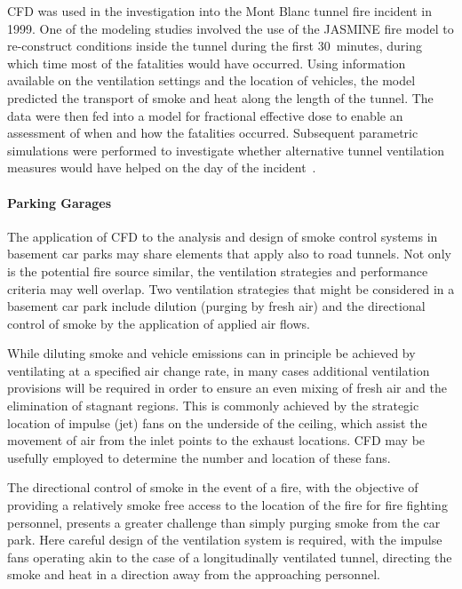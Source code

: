 \documentclass[graybox]{svmult}
\begin{document}
CFD was used in the investigation into the Mont Blanc tunnel fire incident in 1999. One of the modeling studies involved the use of the JASMINE fire model to re-construct conditions inside the tunnel during the first 30~minutes, during which time most of the fatalities would have occurred. Using information available on the ventilation settings and the location of vehicles, the model predicted the transport of smoke and heat along the length of the tunnel. The data were then fed into a model for fractional effective dose to enable an assessment of when and how the fatalities occurred. Subsequent parametric simulations were performed to investigate whether alternative tunnel ventilation measures would have helped on the day of the incident~\cite{Miles:2004}.


\paragraph{Parking Garages}

The application of CFD to the analysis and design of smoke control systems in basement car parks may share elements that apply also to road tunnels. Not only is the potential fire source similar, the ventilation strategies and performance criteria may well overlap. Two ventilation strategies that might be considered in a basement car park include dilution (purging by fresh air) and the directional control of smoke by the application of applied air flows.

While diluting smoke and vehicle emissions can in principle be achieved by ventilating at a specified air change rate, in many cases additional ventilation provisions will be required in order to ensure an even mixing of fresh air and the elimination of stagnant regions. This is commonly achieved by the strategic location of impulse (jet) fans on the underside of the ceiling, which assist the movement of air from the inlet points to the exhaust locations. CFD may be usefully employed to determine the number and location of these fans.

The directional control of smoke in the event of a fire, with the objective of providing a relatively smoke free access to the location of the fire for fire fighting personnel, presents a greater challenge than simply purging smoke from the car park. Here careful design of the ventilation system is required, with the impulse fans operating akin to the case of a longitudinally ventilated tunnel, directing the smoke and heat in a direction away from the approaching personnel.
\end{document}
